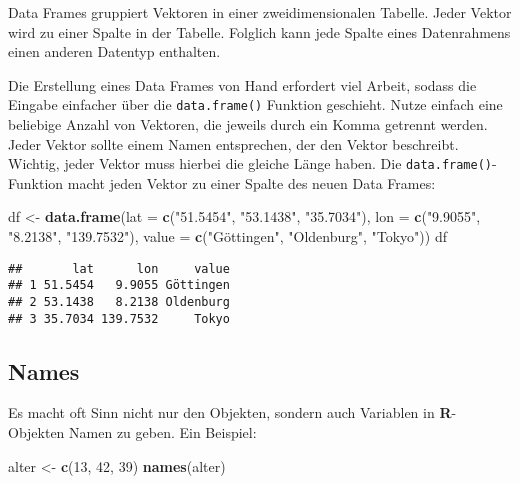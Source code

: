 \documentclass[
]{book}
\newenvironment{Shaded}{\begin{snugshade}}{\end{snugshade}}
\newcommand{\DataTypeTok}[1]{\textcolor[rgb]{0.13,0.29,0.53}{#1}}
\newcommand{\DecValTok}[1]{\textcolor[rgb]{0.00,0.00,0.81}{#1}}
\newcommand{\KeywordTok}[1]{\textcolor[rgb]{0.13,0.29,0.53}{\textbf{#1}}}
\newcommand{\NormalTok}[1]{#1}
\newcommand{\StringTok}[1]{\textcolor[rgb]{0.31,0.60,0.02}{#1}}
\begin{document}
Data Frames gruppiert Vektoren in einer zweidimensionalen Tabelle.
Jeder Vektor wird zu einer Spalte in der Tabelle.
Folglich kann jede Spalte eines Datenrahmens einen anderen Datentyp enthalten.

Die Erstellung eines Data Frames von Hand erfordert viel Arbeit, sodass die Eingabe einfacher über die \texttt{data.frame()} Funktion geschieht.
Nutze einfach eine beliebige Anzahl von Vektoren, die jeweils durch ein Komma getrennt werden. Jeder Vektor sollte einem Namen entsprechen, der den Vektor beschreibt.
Wichtig, jeder Vektor muss hierbei die gleiche Länge haben.
Die \texttt{data.frame()}-Funktion macht jeden Vektor zu einer Spalte des neuen Data Frames:

\begin{Shaded}
\begin{Highlighting}[]
\NormalTok{df <-}\StringTok{ }\KeywordTok{data.frame}\NormalTok{(}\DataTypeTok{lat =} \KeywordTok{c}\NormalTok{(}\StringTok{"51.5454"}\NormalTok{, }\StringTok{"53.1438"}\NormalTok{, }\StringTok{"35.7034"}\NormalTok{),}
                 \DataTypeTok{lon =} \KeywordTok{c}\NormalTok{(}\StringTok{"9.9055"}\NormalTok{, }\StringTok{"8.2138"}\NormalTok{, }\StringTok{"139.7532"}\NormalTok{), }
                 \DataTypeTok{value =} \KeywordTok{c}\NormalTok{(}\StringTok{"Göttingen"}\NormalTok{, }\StringTok{"Oldenburg"}\NormalTok{, }\StringTok{"Tokyo"}\NormalTok{))}
\NormalTok{df}
\end{Highlighting}
\end{Shaded}

\begin{verbatim}
##       lat      lon     value
## 1 51.5454   9.9055 Göttingen
## 2 53.1438   8.2138 Oldenburg
## 3 35.7034 139.7532     Tokyo
\end{verbatim}

\hypertarget{names}{%
\subsection{Names}\label{names}}

Es macht oft Sinn nicht nur den Objekten, sondern auch Variablen in \textbf{R}-Objekten Namen zu geben.
Ein Beispiel:

\begin{Shaded}
\begin{Highlighting}[]
\NormalTok{alter <-}\StringTok{ }\KeywordTok{c}\NormalTok{(}\DecValTok{13}\NormalTok{, }\DecValTok{42}\NormalTok{, }\DecValTok{39}\NormalTok{)}
\KeywordTok{names}\NormalTok{(alter)}
\end{Highlighting}
\end{Shaded}
\end{document}
